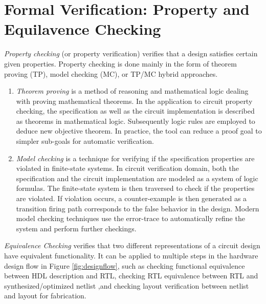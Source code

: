 \section{Formal Verification: Property and Equilavence Checking}


{\it Property checking} (or property verification) verifies
that a design satisfies certain given properties. Property checking is done mainly 
in the form of theorem proving (TP), model checking (MC), or TP/MC hybrid approaches.
\begin{enumerate}[{1)}]
\item \emph{Theorem proving} \cite{theoremproving:91} 
is a method of reasoning and mathematical logic dealing with proving 
mathematical theorems. In the application to circuit property checking, 
the specification as well as the circuit implementation
is described as theorems in mathematical logic. Subsequently logic rules
are employed to deduce new objective theorem. In practice, the tool can reduce
a proof goal to simpler sub-goals for automatic verification.

\item \emph{Model checking} \cite{modelcheck:99} is a technique 
for verifying if the specification properties are violated in finite-state systems. In circuit verification 
domain, both the specification and the circuit implementation are modeled as a system of 
logic formulas. The finite-state system is then traversed to check if the 
properties are violated. If violation occurs, 
a counter-example is then generated as a transition firing path corresponds to the
false behavior in the design. 
Modern model checking techniques use the error-trace to automatically refine
the system and perform further checkings.
\end{enumerate}

{\it Equivalence Checking} verifies that two different representations of
a circuit design have equivalent functionality. It can be applied to 
multiple steps in the hardware design flow in Figure \ref{fig:designflow},
such as checking functional equivalence between HDL description and RTL,
checking RTL equivalence between RTL and synthesized/optimized netlist
,and checking layout verification between netlist and layout for fabrication.


